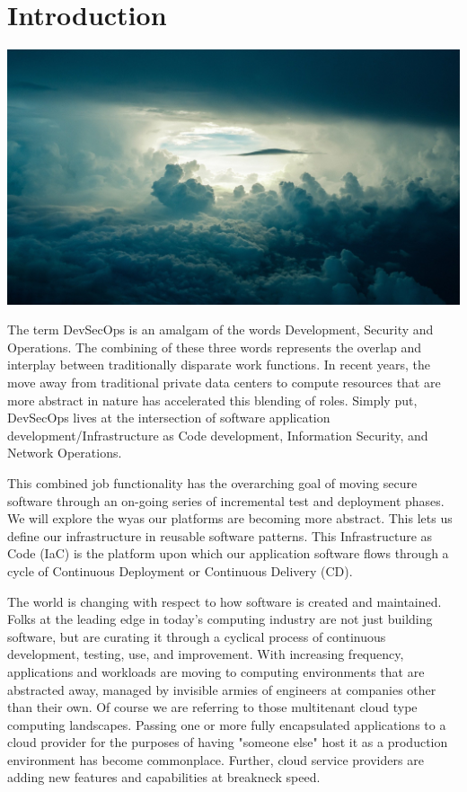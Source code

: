 \chapter{Introduction}

\includegraphics[scale=0.85]{../images/sky-690293_1920.jpg}
\raggedbottom

\justify
The term DevSecOps is an amalgam of the words
Development, Security and Operations. The combining of these three words
represents the overlap and interplay between traditionally disparate work
functions. In recent years, the move away from traditional private data
centers to compute resources that are more abstract in nature has accelerated 
this blending of roles. Simply put, DevSecOps lives at the intersection of
software application development/Infrastructure as Code development,
Information Security, and Network Operations. 

\justify
This combined job functionality has the overarching goal of moving secure
software through an on-going series of incremental test and deployment
phases. We will explore the wyas our platforms are becoming more abstract. This 
lets us define our infrastructure in reusable software patterns. This 
Infrastructure as Code (IaC) is the platform
upon which our application software flows through a cycle of Continuous 
Deployment or Continuous Delivery (CD). 

\justify
The world is changing with respect to how software is created and maintained. 
Folks at the leading edge in today's computing industry are not just building
software, but are curating it through a cyclical process of continuous development,
testing, use, and improvement. With increasing frequency, applications and
workloads are moving to computing environments that are abstracted away, managed
by invisible armies of engineers at companies other than their own. Of course
we are referring to those multitenant cloud type computing landscapes. Passing
one or more fully encapsulated applications to a cloud provider for the purposes
of having "someone else" host it as a production environment has become
commonplace. Further, cloud service providers are adding new features and capabilities 
at breakneck speed.

